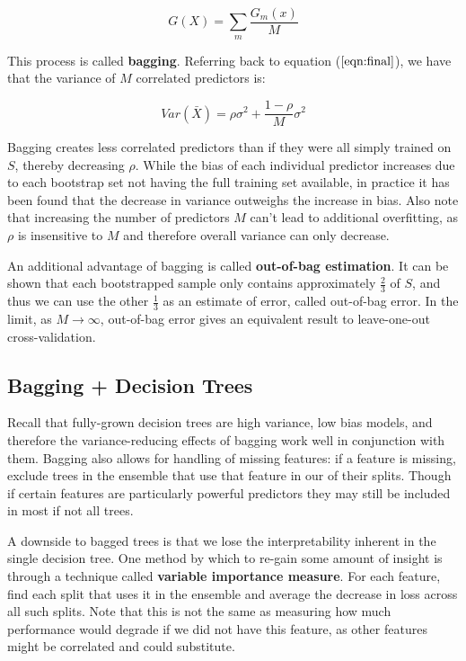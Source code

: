 \documentclass{article}
\begin{document}
$$G(X) = \sum_m \frac{G_m(x)}{M}$$

This process is called {\bf bagging}.  Referring back to equation ($\ref{eqn:final}$), we have that the variance of $M$ correlated predictors is:

$$Var(\bar{X}) = \rho \sigma^2 + \frac{1 - \rho}{M}\sigma^2$$

Bagging creates less correlated predictors than if they were all simply trained on $S$, thereby decreasing $\rho$.  While the bias of each individual predictor increases due to each bootstrap set not having the full training set available, in practice it has been found that the decrease in variance outweighs the increase in bias.  Also note that increasing the number of predictors $M$ can't lead to additional overfitting, as $\rho$ is insensitive to $M$ and therefore overall variance can only decrease.

An additional advantage of bagging is called {\bf out-of-bag estimation}.  It can be shown that each bootstrapped sample only contains approximately $\frac{2}{3}$ of $S$, and thus we can use the other $\frac{1}{3}$ as an estimate of error, called out-of-bag error.  In the limit, as $M \to \infty$, out-of-bag error gives an equivalent result to leave-one-out cross-validation.

\subsection{Bagging + Decision Trees}

Recall that fully-grown decision trees are high variance, low bias models, and therefore the variance-reducing effects of bagging work well in conjunction with them.  Bagging also allows for handling of missing features:  if a feature is missing, exclude trees in the ensemble that use that feature in our of their splits.  Though if certain features are particularly powerful predictors they may still be included in most if not all trees.

A downside to bagged trees is that we lose the interpretability inherent in the single decision tree.  One method by which to re-gain some amount of insight is through a technique called {\bf variable importance measure}.  For each feature, find each split that uses it in the ensemble and average the decrease in loss across all such splits.  Note that this is not the same as measuring how much performance would degrade if we did not have this feature, as other features might be correlated and could substitute. 
\end{document}
